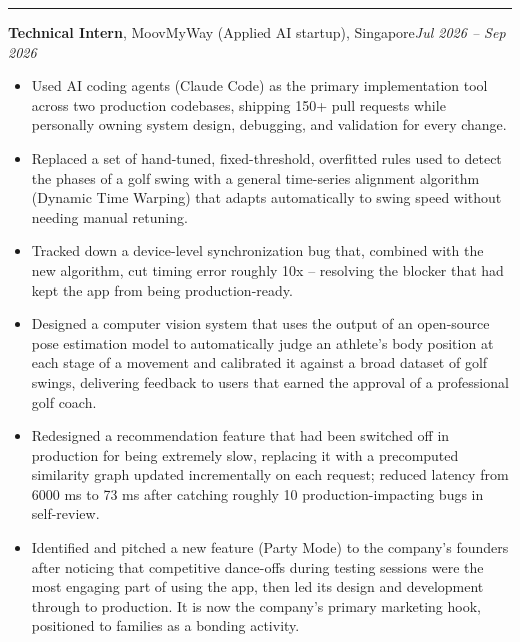 \documentclass[11pt]{article}
\newcommand{\cvsection}[1]{%
  \vspace{10pt}%
  \noindent{\large\bfseries\MakeUppercase{#1}}\par
  \vspace{-4pt}\noindent\rule{\linewidth}{0.7pt}\vspace{4pt}%
}
\begin{document}
\cvsection{Experience}
\noindent\textbf{Technical Intern}, MoovMyWay (Applied AI startup), Singapore\hfill\textit{Jul 2026 -- Sep 2026}\par
\begin{itemize}
  \item Used AI coding agents (Claude Code) as the primary implementation tool across two production codebases, shipping 150+ pull requests while personally owning system design, debugging, and validation for every change.
  \item Replaced a set of hand-tuned, fixed-threshold, overfitted rules used to detect the phases of a golf swing with a general time-series alignment algorithm (Dynamic Time Warping) that adapts automatically to swing speed without needing manual retuning.
  \item Tracked down a device-level synchronization bug that, combined with the new algorithm, cut timing error roughly 10x -- resolving the blocker that had kept the app from being production-ready.
  \item Designed a computer vision system that uses the output of an open-source pose estimation model to automatically judge an athlete's body position at each stage of a movement and calibrated it against a broad dataset of golf swings, delivering feedback to users that earned the approval of a professional golf coach.
  \item Redesigned a recommendation feature that had been switched off in production for being extremely slow, replacing it with a precomputed similarity graph updated incrementally on each request; reduced latency from 6000 ms to 73 ms after catching roughly 10 production-impacting bugs in self-review.
  \item Identified and pitched a new feature (Party Mode) to the company's founders after noticing that competitive dance-offs during testing sessions were the most engaging part of using the app, then led its design and development through to production. It is now the company's primary marketing hook, positioned to families as a bonding activity.
\end{itemize}
\end{document}
